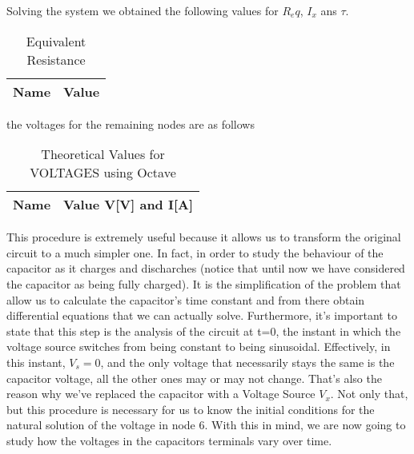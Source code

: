 Solving the system we obtained the following values for $R_eq$, $I_x$ ans $\tau$.

\begin{table}[H]
  \centering
  \begin{tabular}{|l|r|}
    \hline
    {\bf Name} & {\bf Value} \\ \hline
    
  \end{tabular}
  \caption{Equivalent Resistance}
  \label{tab:R_eq}
\end{table}

the voltages for the remaining nodes are as follows

\begin{table}[H]
  \centering
  \begin{tabular}{|l|r|}
    \hline
    {\bf Name} & {\bf Value V[V] and I[A]} \\ \hline
    
  \end{tabular}
  \caption{Theoretical Values for VOLTAGES using Octave}
  \label{tab:alinea2_voltagens_tab}
\end{table}

This procedure is extremely useful because it allows us to transform the original circuit to a much simpler one. In fact, in order to study the behaviour of the capacitor as it charges and discharches (notice that until now we have considered the capacitor as being fully charged). It is the simplification of the problem that allow us to calculate the capacitor's time constant and from there obtain differential equations that we can actually solve.
Furthermore, it's important to state that this step is the analysis of the circuit at t=0, the instant in which the voltage source switches from being constant to being sinusoidal. Effectively, in this instant, $V_{s}=0$, and the only voltage that necessarily stays the same is the capacitor voltage, all the other ones may or may not change. That's also the reason why we've replaced the capacitor with a Voltage Source $V_{x}$. Not only that, but
this procedure is necessary for us to know the initial conditions for the natural solution of the voltage in node 6.
With this in mind, we are now going to study how the voltages in the capacitors terminals vary over time.


